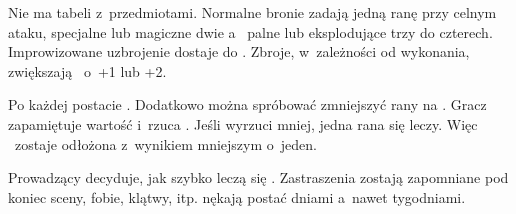 {	

	\noindent
	Nie ma tabeli z~przedmiotami. Normalne bronie zadają jedną ranę przy celnym ataku, specjalne lub magiczne dwie a~ palne lub eksplodujące trzy do czterech. Improwizowane uzbrojenie dostaje  do \AD. Zbroje, w~zależności od wykonania, zwiększają \RD\ o~+1 lub +2.


	\noindent
	Po każdej  postacie . Dodatkowo można spróbować zmniejszyć rany na \HD. Gracz zapamiętuje wartość i~rzuca \HD. Jeśli wyrzuci mniej, jedna rana się leczy. Więc \HD\ zostaje odłożona z~wynikiem mniejszym o~jeden.

	Prowadzący decyduje, jak szybko leczą się . Zastraszenia zostają zapomniane pod koniec sceny, fobie, klątwy, itp. nękają postać dniami a~nawet tygodniami.
}

